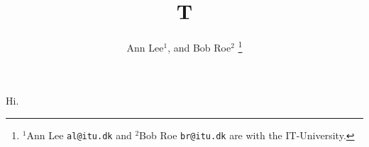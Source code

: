 \documentclass{article}
\author{Ann Lee$^{1}$, and Bob Roe$^{2}$
  \thanks{{$^{1}$Ann Lee {\tt\small al@itu.dk} and $^{2}$Bob Roe \tt\small br@itu.dk} are with the IT-University.}}
\title{T}
\begin{document}
\maketitle
Hi.
\end{document}
